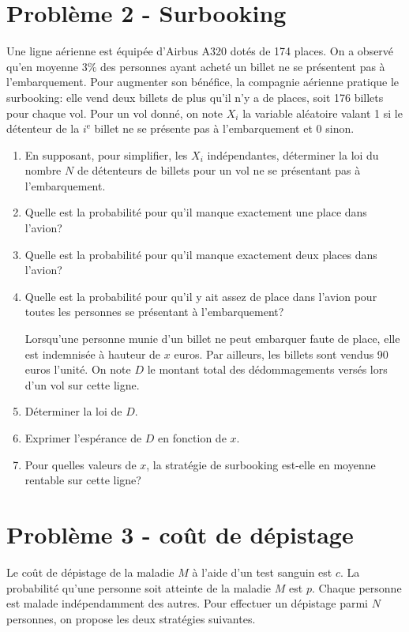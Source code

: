 \documentclass[10pt]{article}
\begin{document}
\section*{Problème 2 - Surbooking}
Une ligne aérienne est équipée d'Airbus A320 dotés de 174 places. On a observé qu'en moyenne $3 \%$ des personnes ayant acheté un billet ne se présentent pas à l'embarquement. Pour augmenter son bénéfice, la compagnie aérienne pratique le surbooking: elle vend deux billets de plus qu'il n'y a de places, soit 176 billets pour chaque vol. Pour un vol donné, on note $X_i$ la variable aléatoire valant 1 si le détenteur de la $i^{\mathrm{e}}$ billet ne se présente pas à l'embarquement et 0 sinon.
\begin{enumerate}
    \item En supposant, pour simplifier, les $X_i$ indépendantes, déterminer la loi du nombre $N$ de détenteurs de billets pour un vol ne se présentant pas à l'embarquement.
    \item Quelle est la probabilité pour qu'il manque exactement une place dans l'avion?
    \item Quelle est la probabilité pour qu'il manque exactement deux places dans l'avion?
    \item Quelle est la probabilité pour qu'il y ait assez de place dans l'avion pour toutes les personnes se présentant à l'embarquement?
    \vspace{1em}
    
    Lorsqu'une personne munie d'un billet ne peut embarquer faute de place, elle est indemnisée à hauteur de $x$ euros. Par ailleurs, les billets sont vendus 90 euros l'unité. On note $D$ le montant total des dédommagements versés lors d'un vol sur cette ligne.
    \item Déterminer la loi de $D$.
    \item Exprimer l'espérance de $D$ en fonction de $x$.
    \item Pour quelles valeurs de $x$, la stratégie de surbooking est-elle en moyenne rentable sur cette ligne?
\end{enumerate}

\newpage

\section*{Problème 3 - coût de dépistage}
Le coût de dépistage de la maladie $M$ à l'aide d'un test sanguin est $c$. La probabilité qu'une personne soit atteinte de la maladie $M$ est $p$. Chaque personne est malade indépendamment des autres. Pour effectuer un dépistage parmi $N$ personnes, on propose les deux stratégies suivantes.
\end{document}
